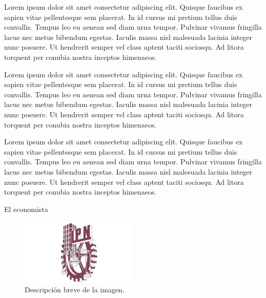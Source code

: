 Lorem ipsum dolor sit amet consectetur adipiscing elit. Quisque faucibus ex sapien vitae pellentesque sem placerat. In id cursus mi pretium tellus duis convallis. Tempus leo eu aenean sed diam urna tempor. Pulvinar vivamus fringilla lacus nec metus bibendum egestas. Iaculis massa nisl malesuada lacinia integer nunc posuere. Ut hendrerit semper vel class aptent taciti sociosqu. Ad litora torquent per conubia nostra inceptos himenaeos.

Lorem ipsum dolor sit amet consectetur adipiscing elit. Quisque faucibus ex sapien vitae pellentesque sem placerat. In id cursus mi pretium tellus duis convallis. Tempus leo eu aenean sed diam urna tempor. Pulvinar vivamus fringilla lacus nec metus bibendum egestas. Iaculis massa nisl malesuada lacinia integer nunc posuere. Ut hendrerit semper vel class aptent taciti sociosqu. Ad litora torquent per conubia nostra inceptos himenaeos.

Lorem ipsum dolor sit amet consectetur adipiscing elit. Quisque faucibus ex sapien vitae pellentesque sem placerat. In id cursus mi pretium tellus duis convallis. Tempus leo eu aenean sed diam urna tempor. Pulvinar vivamus fringilla lacus nec metus bibendum egestas. Iaculis massa nisl malesuada lacinia integer nunc posuere. Ut hendrerit semper vel class aptent taciti sociosqu. Ad litora torquent per conubia nostra inceptos himenaeos.

El economista \cite{eleconomista2024}

\begin{figure}[H]
    \centering
    \includegraphics[width=0.5\textwidth]{./img/logo-ipn.png} %
    \caption{Descripción breve de la imagen.}
    \label{fig:ejemplo}
\end{figure}